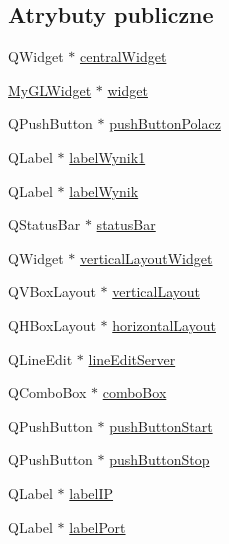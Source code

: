 \subsection*{Atrybuty publiczne}
\begin{DoxyCompactItemize}
\item 
Q\-Widget $\ast$ \hyperlink{classUi__MainWindow_a6600dd3bdd3d55e535659e4a4096ea48}{central\-Widget}
\item 
\hyperlink{classMyGLWidget}{My\-G\-L\-Widget} $\ast$ \hyperlink{classUi__MainWindow_a53bd42b7570ff9a0e4529859b6551a28}{widget}
\item 
Q\-Push\-Button $\ast$ \hyperlink{classUi__MainWindow_ac1c64d26e7ebcb1aadce071550e18da6}{push\-Button\-Polacz}
\item 
Q\-Label $\ast$ \hyperlink{classUi__MainWindow_adc1b943d721ebbdfb47027d194902d43}{label\-Wynik1}
\item 
Q\-Label $\ast$ \hyperlink{classUi__MainWindow_abd47404a5d7fcad65beab8bd5cbe326d}{label\-Wynik}
\item 
Q\-Status\-Bar $\ast$ \hyperlink{classUi__MainWindow_afa919f3af6f2f526a70f1fa331f63724}{status\-Bar}
\item 
Q\-Widget $\ast$ \hyperlink{classUi__MainWindow_a805d415fff07a22a85219e1f22f2da28}{vertical\-Layout\-Widget}
\item 
Q\-V\-Box\-Layout $\ast$ \hyperlink{classUi__MainWindow_aecd96a04789fcfec3f98d80390ad8184}{vertical\-Layout}
\item 
Q\-H\-Box\-Layout $\ast$ \hyperlink{classUi__MainWindow_acd6fdc9ebacc4b25b834162380d75ce8}{horizontal\-Layout}
\item 
Q\-Line\-Edit $\ast$ \hyperlink{classUi__MainWindow_a6637c5ffd655e9860bc45cc7214a8405}{line\-Edit\-Server}
\item 
Q\-Combo\-Box $\ast$ \hyperlink{classUi__MainWindow_af4df84479fcdbcc4c6d2d3e39046317a}{combo\-Box}
\item 
Q\-Push\-Button $\ast$ \hyperlink{classUi__MainWindow_ab56041a4b9969302779f37709ec2aa32}{push\-Button\-Start}
\item 
Q\-Push\-Button $\ast$ \hyperlink{classUi__MainWindow_a7ffebcd872c64954df2f113b5c5a40c4}{push\-Button\-Stop}
\item 
Q\-Label $\ast$ \hyperlink{classUi__MainWindow_a6e626afc4541c9a658e3164a89d10eb3}{label\-I\-P}
\item 
Q\-Label $\ast$ \hyperlink{classUi__MainWindow_a5b07c23cfb9e49ae640e58c604d3e118}{label\-Port}
\end{DoxyCompactItemize}


